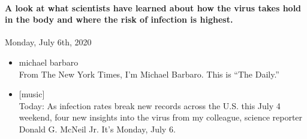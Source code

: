 \hypertarget{a-look-at-what-scientists-have-learned-about-how-the-virus-takes-hold-in-the-body-and-where-the-risk-of-infection-is-highest}{%
\paragraph{A look at what scientists have learned about how the virus
takes hold in the body and where the risk of infection is
highest.}\label{a-look-at-what-scientists-have-learned-about-how-the-virus-takes-hold-in-the-body-and-where-the-risk-of-infection-is-highest}}

Monday, July 6th, 2020

\begin{itemize}
\item
  michael barbaro\\
  From The New York Times, I'm Michael Barbaro. This is ``The Daily.''
\item
  {[}music{]}\\
  Today: As infection rates break new records across the U.S. this July
  4 weekend, four new insights into the virus from my colleague, science
  reporter Donald G. McNeil Jr. It's Monday, July 6.


\end{itemize}
